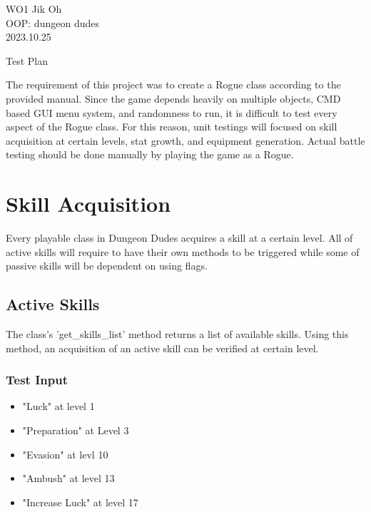 \documentclass[12pt]{article} %
\begin{document}
\begin{flushright}
        WO1 Jik Oh\\
        OOP: dungeon dudes\\
        2023.10.25\\
\end{flushright}

\begin{center}
        {\huge Test Plan}
\end{center}

The requirement of this project was to create a Rogue class according to the provided manual.\newline
\indent
Since the game depends heavily on multiple objects, CMD based GUI menu system, and randomness to run, it is difficult to test every aspect of the Rogue class. For this reason, unit testings will focused on skill acquisition at certain levels, stat growth, and equipment generation. Actual battle testing should be done manually by playing the game as a Rogue. 

\section{Skill Acquisition}
Every playable class in Dungeon Dudes acquires a skill at a certain level. All of active skills will require to have their own methods to be triggered while some of passive skills will be dependent on using flags. 

\subsection{Active Skills}
The class's 'get\_skills\_list' method returns a list of available skills. Using this method, an acquisition of an active skill can be verified at certain level.

\subsubsection*{Test Input}

\begin{itemize}
        \item "Luck" at level 1
        \item "Preparation" at Level 3
        \item "Evasion" at levl 10
        \item "Ambush" at level 13
        \item "Increase Luck" at level 17
\end{itemize}
\end{document}
